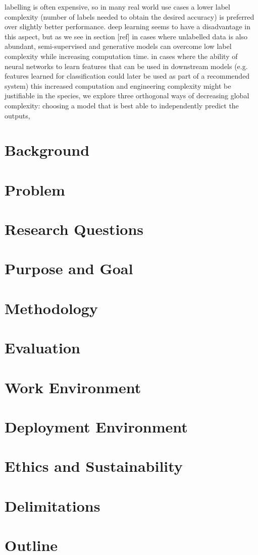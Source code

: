 labelling is often expensive, so in many real world use cases a lower label complexity (number of labels needed to obtain the desired accuracy) is preferred over slightly better performance.
deep learning seems to have a disadvantage in this aspect, but as we see in section [ref] in cases where unlabelled data is also abundant, semi-supervised and generative models can overcome low label complexity while increasing computation time.
in cases where the ability of neural networks to learn features that can be used in downstream models (e.g. features learned for classification could later be used as part of a recommended system) this increased computation and engineering complexity might be justifiable
in the species, we explore three orthogonal ways of decreasing global complexity: choosing a model that is best able to independently predict the outputs,

\section{Background}
\section{Problem}
\section{Research Questions}
\section{Purpose and Goal}
\section{Methodology}
\section{Evaluation}
\section{Work Environment}
\section{Deployment Environment}
\section{Ethics and Sustainability}
\section{Delimitations}
\section{Outline}
